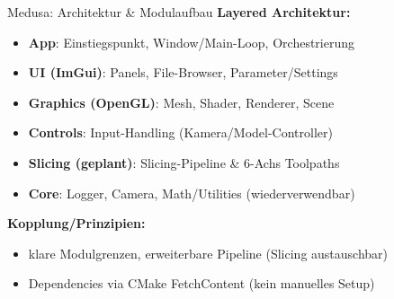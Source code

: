     \begin{frame}{Medusa: Architektur \& Modulaufbau}
        \textbf{Layered Architektur:}
        \begin{itemize}
            \item \textbf{App}: Einstiegspunkt, Window/Main-Loop, Orchestrierung
            \item \textbf{UI (ImGui)}: Panels, File-Browser, Parameter/Settings
            \item \textbf{Graphics (OpenGL)}: Mesh, Shader, Renderer, Scene
            \item \textbf{Controls}: Input-Handling (Kamera/Model-Controller)
            \item \textbf{Slicing (geplant)}: Slicing-Pipeline \& 6-Achs Toolpaths
            \item \textbf{Core}: Logger, Camera, Math/Utilities (wiederverwendbar)
        \end{itemize}

        \vspace{0.35cm}
        \textbf{Kopplung/Prinzipien:}
        \begin{itemize}
            \item klare Modulgrenzen, erweiterbare Pipeline (Slicing austauschbar)
            \item Dependencies via CMake FetchContent (kein manuelles Setup)
        \end{itemize}
    \end{frame}


